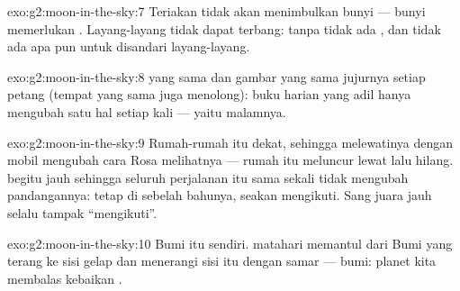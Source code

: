 \begin{solution}{exo:g2:moon-in-the-sky:7}
Teriakan tidak akan menimbulkan bunyi --- bunyi memerlukan .
Layang-layang tidak dapat terbang: tanpa  tidak ada , dan
tidak ada apa pun untuk disandari layang-layang.
\end{solution}

\begin{solution}{exo:g2:moon-in-the-sky:8}
 yang sama dan gambar yang sama jujurnya setiap petang (tempat yang
sama juga menolong): buku harian yang adil hanya mengubah satu hal
setiap kali --- yaitu malamnya.
\end{solution}

\begin{solution}{exo:g2:moon-in-the-sky:9}
Rumah-rumah itu dekat, sehingga melewatinya dengan mobil mengubah cara
Rosa melihatnya --- rumah itu meluncur lewat lalu hilang.  begitu
jauh sehingga seluruh perjalanan itu sama sekali tidak mengubah
pandangannya:  tetap di sebelah bahunya, seakan mengikuti. Sang
juara jauh selalu tampak ``mengikuti''.
\end{solution}

\begin{solution}{exo:g2:moon-in-the-sky:10}
Bumi itu sendiri.  matahari memantul dari Bumi yang terang ke
sisi gelap  dan menerangi sisi itu dengan samar ---  bumi:
planet kita membalas kebaikan .
\end{solution}
